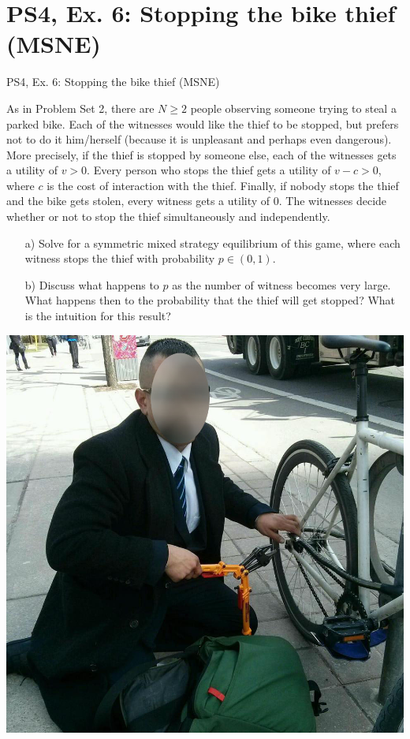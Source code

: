 \section{PS4, Ex. 6: Stopping the bike thief (MSNE)}

\begin{frame}{PS4, Ex. 6: Stopping the bike thief (MSNE)}
  \begin{multicols}{2}
    As in Problem Set 2, there are $N\geq2$ people observing someone trying to steal a parked bike. Each of the witnesses would like the thief to be stopped, but prefers not to do it him/herself (because it is unpleasant and perhaps even dangerous). More precisely, if the thief is stopped by someone else, each of the witnesses gets a utility of $v > 0$. Every person who stops the thief gets a utility of $v-c>0$, where $c$ is the cost of interaction with the thief. Finally, if nobody stops the thief and the bike gets stolen, every witness gets a utility of $0$. The witnesses decide whether or not to stop the thief simultaneously and independently.
  \vfill\null \columnbreak
    \begin{itemize}
      \item[a)] Solve for a symmetric mixed strategy equilibrium of this game, where each witness stops the thief with probability $p\in(0,1)$.
      \item[b)] Discuss what happens to $p$ as the number of witness becomes very large. What happens then to the probability that the thief will get stopped? What is the intuition for this result?
    \end{itemize}
    \includegraphics[width=\columnwidth]{figures/bike_thief}
  \vfill\null
  \end{multicols}
\end{frame}
